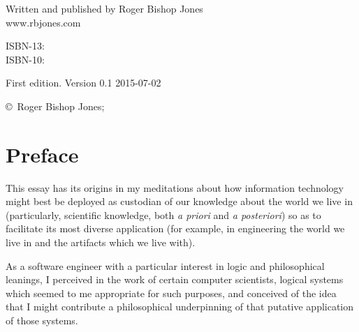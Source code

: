 \begin{titlepage}
\maketitle

\hspace{2in}

\vfill

\begin{centering}

{\small

Written and published by Roger Bishop Jones\\
www.rbjones.com\\

\vspace{0.2in}

ISBN-13: \\
ISBN-10: 

\vspace{0.2in}

}%
{\scriptsize

First edition. \hfil Version 0.1 \hfil 2015-07-02

\vspace{0.2in}

\copyright\ Roger Bishop Jones;

}%

\end{centering}

\thispagestyle{empty}

\end{titlepage}

{\parskip=0pt\tableofcontents}


\chapter*{Preface}\label{Preface}

This essay has its origins in my meditations about how information technology might best be deployed as custodian of our knowledge about the world we live in (particularly, scientific knowledge, both {\it a priori} and {\it a posteriori}) so as to facilitate its most diverse application (for example, in engineering the world we live in and the artifacts which we live with).

As a software engineer with a particular interest in logic and philosophical leanings, I perceived in the work of certain computer scientists, logical systems which seemed to me appropriate for such purposes, and conceived of the idea that I might contribute a philosophical underpinning of that putative application of those systems.


